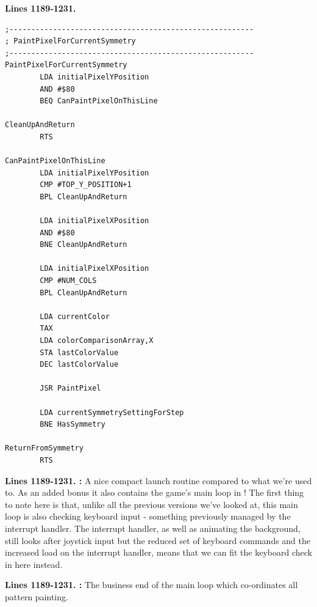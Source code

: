 \clearpage
\textbf{Lines 1189-1231. } 
\begin{lstlisting}[basicstyle=\ttfamily\scriptsize, caption=The routine responsible for painting patterns.]
;--------------------------------------------------------
; PaintPixelForCurrentSymmetry
;--------------------------------------------------------
PaintPixelForCurrentSymmetry   
        LDA initialPixelYPosition
        AND #$80
        BEQ CanPaintPixelOnThisLine

CleanUpAndReturn   
        RTS 

CanPaintPixelOnThisLine   
        LDA initialPixelYPosition
        CMP #TOP_Y_POSITION+1
        BPL CleanUpAndReturn

        LDA initialPixelXPosition
        AND #$80
        BNE CleanUpAndReturn

        LDA initialPixelXPosition
        CMP #NUM_COLS
        BPL CleanUpAndReturn

        LDA currentColor
        TAX 
        LDA colorComparisonArray,X
        STA lastColorValue
        DEC lastColorValue

        JSR PaintPixel

        LDA currentSymmetrySettingForStep
        BNE HasSymmetry

ReturnFromSymmetry   
        RTS 

\end{lstlisting}
\clearpage

\textbf{Lines 1189-1231. :} A nice compact launch routine compared to what we're used to. As an added
bonus it also contains the game's main loop in ! The first thing to note here is that, unlike all the previous
versions we've looked at, this main loop is also checking keyboard input - something previously managed by the interrupt handler. The
interrupt handler, as well as animating the background, still looks after joystick input but the reduced set of keyboard commands and
the increased load on the interrupt handler, means that we can fit the keyboard check in here instead.

\textbf{Lines 1189-1231. :} The business end of the main loop which co-ordinates all pattern
painting.

